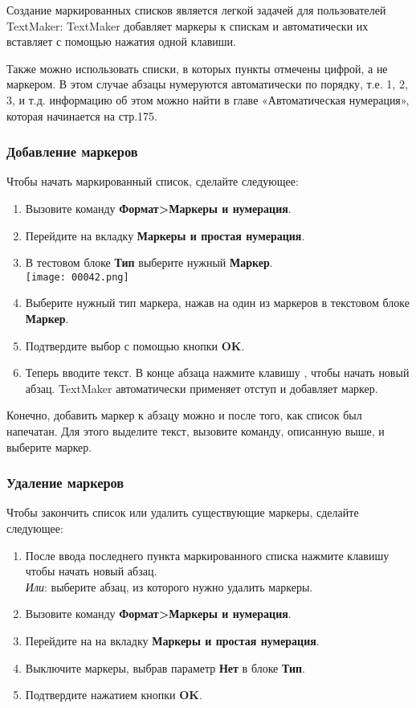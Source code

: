 \documentclass[a4paper,10pt]{article}
\begin{document}
Создание маркированных списков является легкой задачей для пользователей TextMaker: TextMaker добавляет маркеры к спискам и автоматически их вставляет с помощью нажатия одной клавиши.

 Также можно использовать списки, в которых пункты отмечены цифрой, а не маркером. В этом случае абзацы нумеруются автоматически по порядку, т.е. 1, 2, 3, и т.д.  информацию об этом можно найти в главе «Автоматическая нумерация», которая начинается на стр.175.

\subsubsection{Добавление маркеров}
Чтобы начать маркированный список, сделайте следующее:
\begin{enumerate}
 \item Вызовите команду \textbf{Формат>Маркеры и нумерация}.
 \item Перейдите на вкладку \textbf{Маркеры и простая нумерация}.
 \item В тестовом блоке \textbf{Тип} выберите нужный \textbf{Маркер}.\\
 \texttt{[image: 00042.png]}
 \item Выберите нужный тип маркера, нажав на один из маркеров в текстовом блоке \textbf{Маркер}.
 \item Подтвердите выбор с помощью кнопки \textbf{OK}.
 \item Теперь вводите текст. В конце абзаца нажмите клавишу , чтобы начать новый абзац. TextMaker автоматически применяет отступ и добавляет маркер.
\end{enumerate}

Конечно, добавить маркер к абзацу можно и после того, как список был напечатан. Для этого выделите текст, вызовите команду, описанную выше, и выберите маркер.

\subsubsection{Удаление маркеров}
Чтобы закончить список или удалить существующие маркеры, сделайте следующее:
\begin{enumerate}
 \item После ввода последнего пункта маркированного списка нажмите клавишу  чтобы начать новый абзац.\\
 \textit{Или}: выберите абзац, из которого нужно удалить маркеры.
 \item Вызовите команду \textbf{Формат>Маркеры и нумерация}.
 \item Перейдите на на вкладку \textbf{Маркеры и простая нумерация}. 
 \item Выключите маркеры, выбрав параметр \textbf{Нет} в блоке \textbf{Тип}.
 \item Подтвердите нажатием кнопки \textbf{OK}.
\end{enumerate}
\end{document}
